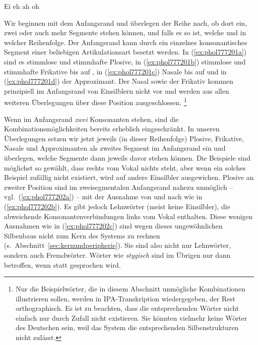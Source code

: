 \begin{exe}
	\ex\label{ex:phol777200}
	\begin{xlist}
		\ex Ei \textipa{[P\t{aE}]}
		\ex eh \textipa{[Pe:]}
		\ex ah \textipa{[Pa:]}	
		\ex oh \textipa{[Po:]}	
	\end{xlist}
\end{exe}

Wir beginnen mit dem Anfangsrand und überlegen der Reihe nach, ob dort ein, zwei oder auch mehr Segmente stehen können, und falls es so ist, welche und in welcher Reihenfolge.
Der Anfangsrand kann durch ein einzelnes konsonantisches Segment einer beliebigen Artikulationsart besetzt werden.
In (\ref{ex:phol777201a}) sind es stimmlose und stimmhafte Plosive, in (\ref{ex:phol777201b}) stimmlose und stimmhafte Frikative bis auf \textipa{[\c{c}]}, in (\ref{ex:phol777201c}) Nasale bis auf \textipa{[N]} und in (\ref{ex:phol777201d}) der Approximant.
Der Nasal \textipa{[N]} sowie der Frikativ \textipa{[\c{c}]} kommen prinzipiell im Anfangsrand von Einsilblern nicht vor und werden aus allen weiteren Überlegungen über diese Position ausgeschlossen.%
\footnote{Nur die Beispielwörter, die in diesem Abschnitt unmögliche Kombinationen illustrieren sollen, werden in IPA-Transkription wiedergegeben, der Rest orthographisch.
Es ist zu beachten, dass die entsprechenden Wörter nicht einfach nur durch Zufall nicht existieren.
Sie könnten vielmehr keine Wörter des Deutschen sein, weil das System die entsprechenden Silbenstrukturen nicht zulässt.}

\begin{exe}
	\ex\label{ex:phol777201}
	\begin{xlist}
		\ex{\label{ex:phol777201a} Kuh, geh}
		\ex{\label{ex:phol777201b} Schuh, hau, Reh, Vieh, wo, *\textipa{[\c{c}i:]}}
		\ex{\label{ex:phol777201c} nie, mäh, *\textipa{[Nu:]}}
		\ex{\label{ex:phol777201d} lau}
	\end{xlist}
\end{exe}

Wenn im Anfangsrand \textit{zwei} Konsonanten stehen, sind die Kombinationsmöglichkeiten bereits erheblich eingeschränkt.
In unseren Überlegungen setzen wir jetzt jeweils (in dieser Reihenfolge) Plosive, Frikative, Nasale und Approximanten als zweites Segment im Anfangsrand ein und überlegen, welche Segmente dann jeweils davor stehen können.
Die Beispiele sind möglichst so gewählt, dass rechts vom Vokal nichts steht, aber wenn ein solches Beispiel zufällig nicht existiert, wird auf andere Einsilbler ausgewichen.
Plosive an zweiter Position sind im zweisegmentalen Anfangsrand nahezu unmöglich -- vgl.\ (\ref{ex:phol777202a}) -- mit der Ausnahme von \textipa{[p]} und \textipa{[t]} nach \textipa{[S]} wie in (\ref{ex:phol777202b}).
Es gibt jedoch Lehnwörter (meist keine Einsilbler), die abweichende Konsonantenverbindungen links vom Vokal enthalten.
Diese wenigen Ausnahmen wie in (\ref{ex:phol777202c}) sind wegen dieses ungewöhnlichen Silbenbaus nicht zum Kern des Systems zu rechnen (s.\ Abschnitt~\ref{sec:kernundperipherie}).
Sie sind also nicht nur Lehnwörter, sondern auch Fremdwörter.
Wörter wie \textit{stygisch} sind im Übrigen nur dann betroffen, wenn \textipa{[st]} statt \textipa{[St]} gesprochen wird.

